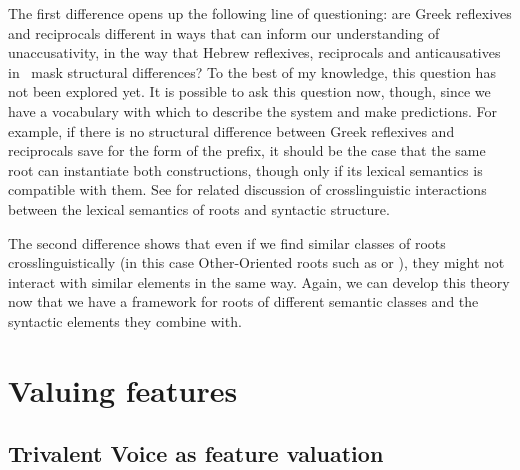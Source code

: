 The first difference opens up the following line of questioning: are Greek reflexives and reciprocals different in ways that can inform our understanding of unaccusativity, in the way that Hebrew reflexives, reciprocals and anticausatives in \thit~mask structural differences? To the best of my knowledge, this question has not been explored yet. It is possible to ask this question now, though, since we have a vocabulary with which to describe the system and make predictions. For example, if there is no structural difference between Greek reflexives and reciprocals save for the form of the prefix, it should be the case that the same root can instantiate both constructions, though only if its lexical semantics is compatible with them. See \cite{alexiadouborerschaefer14} for related discussion of crosslinguistic interactions between the lexical semantics of roots and syntactic structure.

The second difference shows that even if we find similar classes of roots crosslinguistically (in this case Other-Oriented roots such as  or ), they might not interact with similar elements in the same way. Again, we can develop this theory now that we have a framework for roots of different semantic classes and the syntactic elements they combine with.



\section{Valuing features} \label{i:agree}

	\subsection{Trivalent Voice as feature valuation} \label{i:agree:nie}




